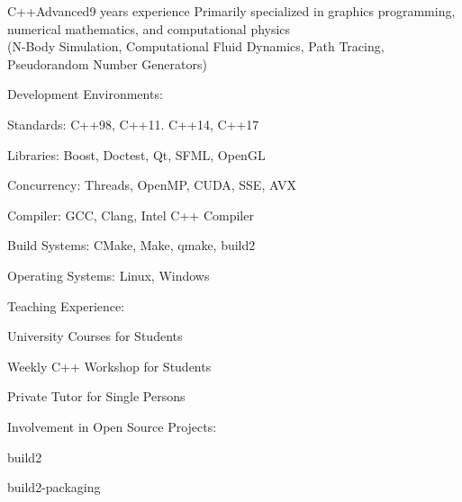 \documentclass[a4paper,10pt]{cv}
\begin{document}
        \begin{cvLongSkillItem}{C++}{Advanced}{9 years experience}
          Primarily specialized in graphics programming, numerical mathematics, and computational physics \\
          (N-Body Simulation, Computational Fluid Dynamics, Path Tracing, Pseudorandom Number Generators)\\
          \vspace{-15pt}
          \begin{multicols}{2}
          Development Environments:
          \begin{cvItemize}
            \item Standards: C++98, C++11. C++14, C++17
            \item Libraries: Boost, Doctest, Qt, SFML, OpenGL
            \item Concurrency: Threads, OpenMP, CUDA, SSE, AVX
            \item Compiler: GCC, Clang, Intel C++ Compiler
            \item Build Systems: CMake, Make, qmake, build2
            \item Operating Systems: Linux, Windows
          \end{cvItemize}
          Teaching Experience:
          \begin{cvItemize}
            \item University Courses for Students
            \item Weekly C++ Workshop for Students
            \item Private Tutor for Single Persons
          \end{cvItemize}
          Involvement in Open Source Projects:
          \begin{cvItemize}
            \item build2
            \item build2-packaging
          \end{cvItemize}
          \end{multicols}
        \end{cvLongSkillItem}
\end{document}
